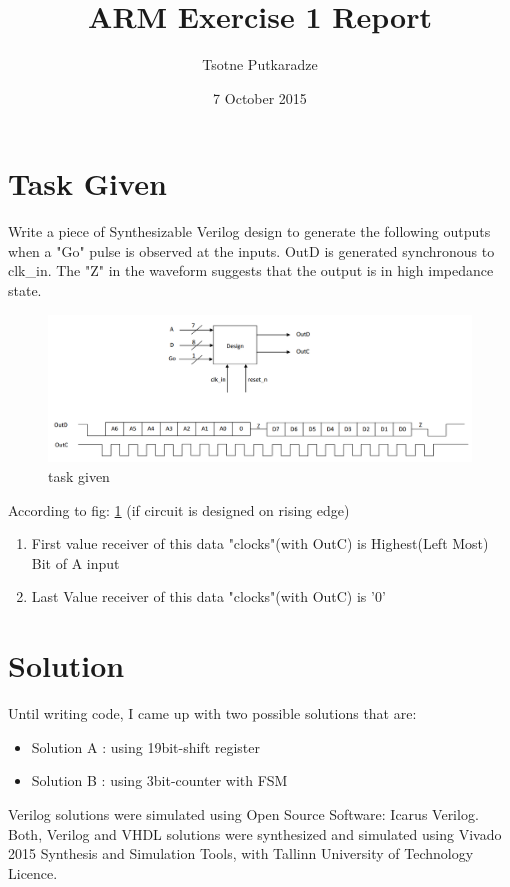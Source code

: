 \documentclass{article}
\title{ARM Exercise 1 Report}
\author{Tsotne Putkaradze}
\date{7 October 2015}
\begin{document}
\maketitle


\section{Task Given}
Write a piece of Synthesizable Verilog design to generate the following outputs when a "Go" pulse is observed at the inputs. OutD is generated synchronous to clk\_in. The "Z" in the waveform suggests that the output is in high impedance state.

\begin{figure}[H]
\centering
\includegraphics[width=\textwidth] {task_arm.png}
\caption{task given}
\label{fig:task_arm}
\end{figure}

According to fig: \ref{fig:task_arm} (if circuit is designed on rising edge)
\begin{enumerate}
\item First value receiver of this data "clocks"(with OutC) is Highest(Left Most) Bit of A input
\item Last Value receiver of this data "clocks"(with OutC) is '0' 
\end{enumerate}

\newpage
\section{Solution}
Until writing code, I came up with two possible solutions that are: 
\begin{itemize}
\item Solution A : using 19bit-shift register
\item Solution B : using 3bit-counter with FSM
\end{itemize}

Verilog solutions were simulated using Open Source Software: Icarus Verilog.
Both, Verilog and VHDL solutions were synthesized and simulated using Vivado 2015 Synthesis and Simulation Tools, with Tallinn University of Technology Licence. 
\end{document}
